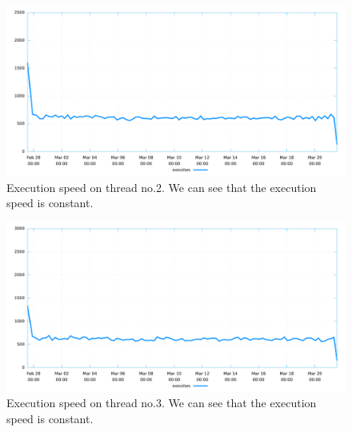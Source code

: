\begin{figure}[H]
	\centering
	\includegraphics[width=0.8\linewidth]{obrazky-figures/thread_1/exec_speed.pdf}
	\caption{Execution speed on thread no.2. We can see that the execution speed
	is constant.}
	\label{fuz:result2a}
\end{figure}

\begin{figure}[H]
	\centering
	\includegraphics[width=0.8\linewidth]{obrazky-figures/thread_2/exec_speed.pdf}
	\caption{Execution speed on thread no.3. We can see that the execution speed
	is constant.}
	\label{fuz:result3a}
\end{figure}

